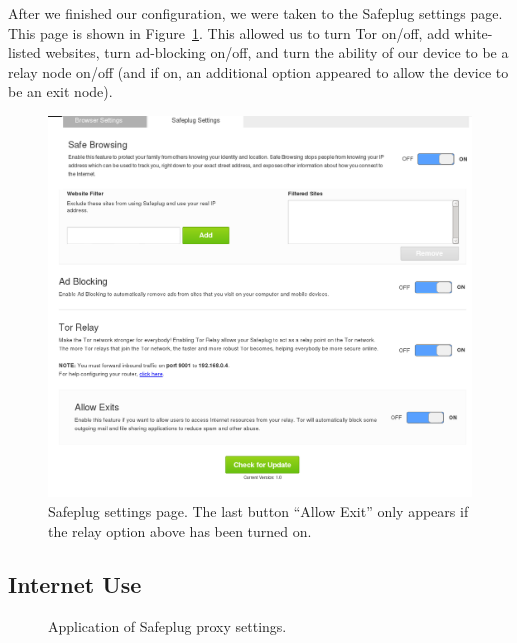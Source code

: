 \documentclass[conference]{IEEEtran}
\begin{document}
After we finished our configuration, we were taken to the Safeplug settings page.  This page is shown in Figure~\ref{fig:settings}.  This allowed us to turn Tor on/off, add white-listed websites, turn ad-blocking on/off, and turn the ability of our device to be a relay node on/off (and if on, an additional option appeared to allow the device to be an exit node).  

\begin{figure}[htb]
  \begin{center}
  \includegraphics[width=.4\textwidth]{settings_with_exit}
  \caption{Safeplug settings page.  The last button ``Allow Exit'' only appears if the relay option above has been turned on.}
  \label{fig:settings}
  \end{center}
\end{figure}

\subsection{Internet Use}
\label{inetuse}

\begin{figure}[tb]
\centering
{}
\quad
{}
\caption{Application of Safeplug proxy settings.}
\end{figure}
\end{document}
